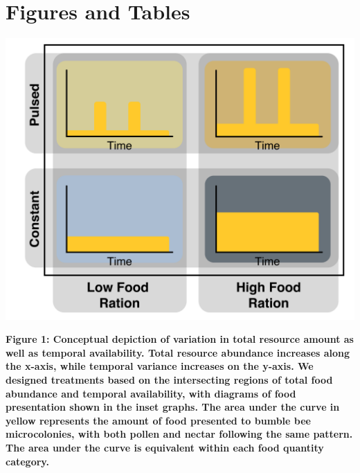 \documentclass[11pt,]{article}
\begin{document}
\hypertarget{figures-and-tables}{%
\section{Figures and Tables}\label{figures-and-tables}}

\newpage

\begin{center}\includegraphics[width=1\linewidth]{ms_figs/fig1_conceptual} \end{center}

\textbf{Figure 1: Conceptual depiction of variation in total resource
amount as well as temporal availability. Total resource abundance
increases along the x-axis, while temporal variance increases on the
y-axis. We designed treatments based on the intersecting regions of
total food abundance and temporal availability, with diagrams of food
presentation shown in the inset graphs. The area under the curve in
yellow represents the amount of food presented to bumble bee
microcolonies, with both pollen and nectar following the same pattern.
The area under the curve is equivalent within each food quantity
category.} \clearpage

\newpage
\end{document}
